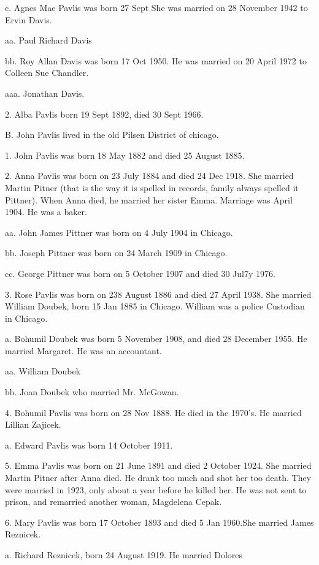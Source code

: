 \documentclass[a4paper]{article}
\begin{document}
c. Agnes Mae Pavlis was born 27 Sept She was married on 28 November 1942 to Ervin Davis.  

aa.  Paul Richard Davis

bb. Roy Allan Davis was born 17 Oct 1950.  He was married on 20 April 1972 to Colleen Sue Chandler.  

aaa. Jonathan Davis. 

2. Alba Pavlis born 19 Sept 1892, died 30 Sept 1966.    

B. John Pavlis lived in the old Pilsen District of chicago.  

1. John Pavlis was born 18 May 1882 and died 25 August 1885.

2. Anna Pavlis was born on 23 July 1884 and died 24 Dec 1918.  She married Martin Pitner (that is the way it is spelled in records, family always spelled it Pittner).  When Anna died, he married her sister Emma.  Marriage was April 1904.  He was a baker.  

aa. John James Pittner was born on 4 July 1904 in Chicago.

bb. Joseph Pittner was born on 24 March 1909 in Chicago.

cc. George Pittner was born on 5 October 1907 and died 30 Jul7y 1976.

3. Rose Pavlis was born on 238 August 1886 and died 27 April 1938.  She married William Doubek, born 15 Jan 1885 in Chicago.  William was a police Custodian in Chicago.  

a. Bohumil Doubek was born 5 November 1908, and died 28 December 1955.  He married Margaret.  He was an accountant.

aa. William Doubek

bb. Joan Doubek who married Mr. McGowan.

4. Bohumil Pavlis was born on 28 Nov 1888.  He died in the 1970's. He married Lillian Zajicek.  

a. Edward Pavlis was born 14 October 1911.  

5. Emma Pavlis was born on 21 June 1891 and died 2 October 1924.  She married Martin Pitner after Anna died.  He drank too much and shot her too death. They were married in 1923, only about a year before he killed her.  He was not sent to prison, and remarried another woman, Magdelena Cepak.  

6. Mary Pavlis was born 17 October 1893 and died 5 Jan 1960.She married James Reznicek.

a. Richard Reznicek, born 24 August 1919.  He married Dolores
\end{document}
